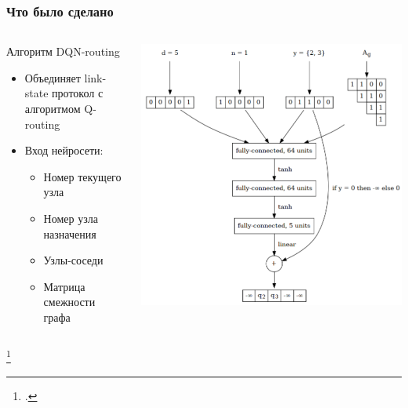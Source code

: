 \documentclass{beamer}
\begin{document}
\begin{frame}
  \frametitle{Что было сделано}
  \begin{columns}
    \begin{column}{0.5\textwidth}
      Алгоритм DQN-routing\footnotemark
      \begin{itemize}
      \item Объединяет link-state протокол с алгоритмом Q-routing
      \item Вход нейросети:
        \begin{itemize}
        \item Номер текущего узла
        \item Номер узла назначения
        \item Узлы-соседи
        \item Матрица смежности графа
        \end{itemize}
      \end{itemize}
    \end{column}
    \begin{column}{0.5\textwidth}
      \begin{center}
        \includegraphics[width=\textwidth]{nn-2}
      \end{center}
    \end{column}
  \end{columns}
  \footcitetext{mukhutdinov2019multi}
\end{frame}
\end{document}
